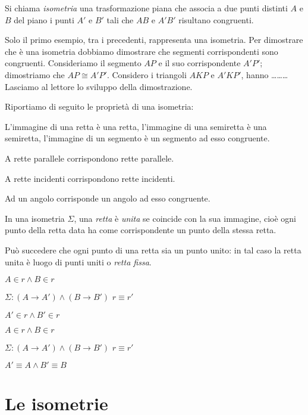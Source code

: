 \begin{definizione}
Si chiama \emph{isometria} una trasformazione piana che associa a due punti distinti $A$ e $B$ del piano i punti $A'$ e $B'$ tali che $AB$ e $A'B'$ risultano congruenti.
\end{definizione}

Solo il primo esempio, tra i precedenti, rappresenta una isometria. Per dimostrare che è una isometria dobbiamo dimostrare che segmenti corrispondenti sono congruenti. Consideriamo il segmento $AP$ e il suo corrispondente $A'P'$; dimostriamo che $AP\cong A'P'$. Considero i triangoli $AKP$ e $A'KP'$, hanno \ldots\ldots\ldots{}\\
Lasciamo al lettore lo sviluppo della dimostrazione.

Riportiamo di seguito le proprietà di una isometria:
\begin{itemize*}
\item L'immagine di una retta è una retta, l'immagine di una semiretta è una semiretta, l'immagine di un segmento è un segmento ad esso congruente.
\item A rette parallele corrispondono rette parallele.
\item A rette incidenti corrispondono rette incidenti.
\item Ad un angolo corrisponde un angolo ad esso congruente.
\end{itemize*}

\begin{definizione}
In una isometria $\Sigma$, una \emph{retta} è \emph{unita} se coincide con la sua immagine, cioè ogni punto della retta data ha come corrispondente un punto della stessa retta.
\end{definizione}

Può succedere che ogni punto di una retta sia un punto unito: in tal caso la retta unita è luogo di punti uniti o \emph{retta fissa}.

$A\in r \wedge B\in r$

$\Sigma : (A\rightarrow A') \wedge (B\rightarrow B')$  $r\equiv r'$

$A'\in r \wedge B'\in r$


$A\in r \wedge B\in r$

$\Sigma : (A\rightarrow A') \wedge (B\rightarrow B')$  $r\equiv r'$

$A'\equiv A \wedge B'\equiv B$



\section{Le isometrie}

